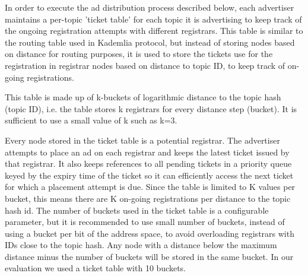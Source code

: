 In order to execute the ad distribution process described below,  each advertiser maintains a per-topic 'ticket table' for each topic it is advertising to keep track of the ongoing registration attempts with different registrars. 
This table is similar to the routing table used in Kademlia protocol, 
but instead of storing nodes based on distance for routing purposes, 
it is used to store the tickets use for the registration in registrar nodes based 
on distance to topic ID, to keep track of on-going registrations.

This table is made up of k-buckets of logarithmic distance to the topic hash (topic ID), i.e. the table stores k registrars for every distance step (bucket). It is sufficient to use a small value of k such as k=3. 

Every node stored in the ticket table is a potential registrar. The advertiser attempts to place an ad on each registrar and keeps the latest ticket issued by that registrar. It also keeps references to all pending tickets in a priority queue keyed by the expiry time of the ticket so it can efficiently access the next ticket for which a placement attempt is due.
Since the table is limited to K values per bucket,  this means there are K on-going registrations per distance to the topic hash id. 
The number of buckets used in the ticket table is a configurable parameter, but it is recommended to use small number of buckets,  instead of using a bucket per bit of the address space,  to avoid overloading registrars with IDs close to the topic hash. 
Any node with a distance below the maximum distance minus the number of buckets will be stored in the same bucket.
In our evaluation we used a ticket table with 10 buckets. 

